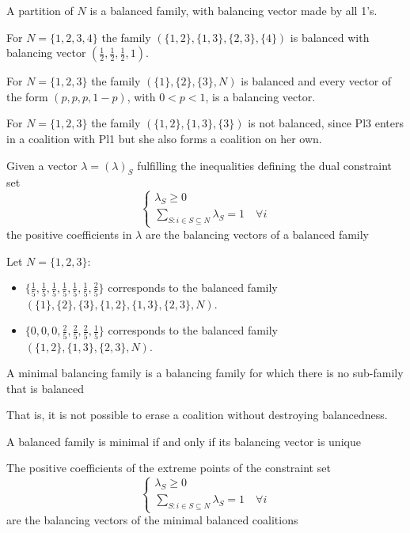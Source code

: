 \documentclass[../main.tex]{subfiles}
\begin{document}
\begin{example}
    A partition of $N$ is a balanced family, with balancing vector made by all 1’s.

    For $N= \{1,2,3,4\}$ the family $(\{1,2\},\{1,3\},\{2,3\},\{4\})$ is balanced with balancing vector $(\frac{1}{2}, \frac{1}{2},\frac{1}{2}, 1)$.

    For $N= \{1,2,3\}$ the family $(\{1\},\{2\},\{3\},N)$ is balanced and every vector of the form $(p,p,p,1-p)$, with $0 <p <1$, is a balancing vector.

    For $N= \{1,2,3\}$ the family $(\{1,2\},\{1,3\},\{3\})$ is not balanced, since Pl3 enters in a coalition with Pl1 but she also forms a coalition on her own.
\end{example}
\begin{remark}
    Given a vector $\lambda= (\lambda)_S$ fulfilling the inequalities defining the dual constraint set
    \[
        \begin{cases}
            \lambda_S \geq 0 \\
            \sum_{S:i\in S \subseteq N} \lambda_S = 1 \quad \forall i
        \end{cases}
    \]
    the positive coefficients in $\lambda$ are the balancing vectors of a balanced family
\end{remark}
\begin{example}
    Let $N= \{1,2,3\}$:
    \begin{itemize}
        \item $\{\frac{1}{5}, \frac{1}{5},\frac{1}{5},\frac{1}{5},\frac{1}{5},\frac{1}{5},\frac{2}{5}\}$ corresponds to the balanced family $(\{1\},\{2\},\{3\},\{1,2\},\{1,3\},\{2,3\},N)$.
        \item $\{0,0,0, \frac{2}{5},\frac{2}{5},\frac{2}{5}, \frac{1}{5}\}$ corresponds to the balanced family $(\{1,2\},\{1,3\},\{2,3\},N)$.
    \end{itemize}
\end{example}
\begin{definition}
    A minimal balancing family is a balancing family for which there is no sub-family that is balanced
\end{definition}
That is, it is not possible to erase a coalition without destroying balancedness.
\begin{lemma}
    A balanced family is minimal if and only if its balancing vector is unique
\end{lemma}
\begin{theorem}
    The positive coefficients of the extreme points of the constraint set
    \[
        \begin{cases}
            \lambda_S \geq 0 \\
            \sum_{S:i\in S \subseteq N} \lambda_S = 1 \quad \forall i
        \end{cases}
    \]
    are the balancing vectors of the minimal balanced coalitions
\end{theorem}
\end{document}
